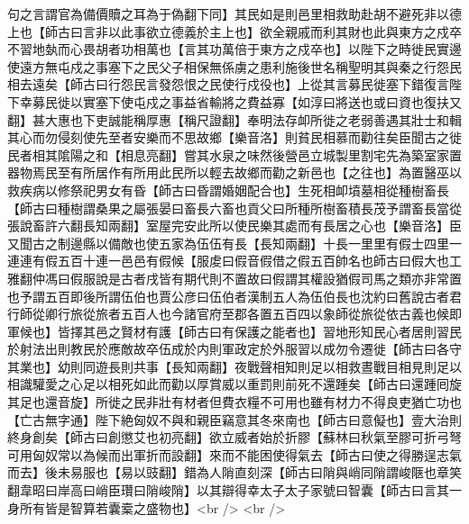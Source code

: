 句之言謂官為備價贖之耳為于偽翻下同】其民如是則邑里相救助赴胡不避死非以德上也【師古曰言非以此事欲立德義於主上也】欲全親戚而利其財也此與東方之戍卒不習地埶而心畏胡者功相萬也【言其功萬倍于東方之戍卒也】以陛下之時徙民實邊使遠方無屯戍之事塞下之民父子相保無係虜之患利施後世名稱聖明其與秦之行怨民相去遠矣【師古曰行怨民言發怨恨之民使行戍役也】上從其言募民徙塞下錯復言陛下幸募民徙以實塞下使屯戍之事益省輸將之費益寡【如淳曰將送也或曰資也復扶又翻】甚大惠也下吏誠能稱厚惠【稱尺證翻】奉明法存卹所徙之老弱善遇其壯士和輯其心而勿侵刻使先至者安樂而不思故鄉【樂音洛】則貧民相慕而勸往矣臣聞古之徙民者相其隂陽之和【相息亮翻】嘗其水泉之味然後營邑立城製里割宅先為築室家置器物焉民至有所居作有所用此民所以輕去故鄉而勸之新邑也【之往也】為置醫巫以救疾病以修祭祀男女有昏【師古曰昏謂婚姻配合也】生死相卹墳墓相從種樹畜長【師古曰種樹謂桑果之屬張晏曰畜長六畜也貢父曰所種所樹畜積長茂予謂畜長當從張說畜許六翻長知兩翻】室屋完安此所以使民樂其處而有長居之心也【樂音洛】臣又聞古之制邊縣以備敵也使五家為伍伍有長【長知兩翻】十長一里里有假士四里一連連有假五百十連一邑邑有假候【服䖍曰假音假借之假五百帥名也師古曰假大也工雅翻仲馮曰假服說是古者戌皆有期代則不置故曰假謂其權設猶假司馬之類亦非常置也予謂五百即後所謂伍伯也賈公彦曰伍伯者漢制五人為伍伯長也沈約曰舊說古者君行師從卿行旅從旅者五百人也今諸官府至郡各置五百四以象師從旅從依古義也候即軍候也】皆擇其邑之賢材有護【師古曰有保護之能者也】習地形知民心者居則習民於射法出則教民於應敵故卒伍成於内則軍政定於外服習以成勿令遷徙【師古曰各守其業也】幼則同遊長則共事【長知兩翻】夜戰聲相知則足以相救晝戰目相見則足以相識驩愛之心足以相死如此而勸以厚賞威以重罰則前死不還踵矣【師古曰還踵囘旋其足也還音旋】所徙之民非壯有材者但費衣糧不可用也雖有材力不得良吏猶亡功也【亡古無字通】陛下絶匈奴不與和親臣竊意其冬來南也【師古曰意儗也】壹大治則終身創矣【師古曰創懲艾也初亮翻】欲立威者始於折膠【蘇林曰秋氣至膠可折弓弩可用匈奴常以為候而出軍折而設翻】來而不能困使得氣去【師古曰使之得勝逞志氣而去】後未易服也【易以豉翻】錯為人陗直刻深【師古曰陗與峭同陗謂峻陿也章笑翻韋昭曰岸高曰峭臣瓚曰陗峻陗】以其辯得幸太子太子家號曰智囊【師古曰言其一身所有皆是智算若囊槖之盛物也】<br />
<br />
